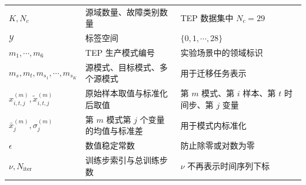 \documentclass{seuthesis-2022}
\begin{document}
{\begin{longtable}{@{}>{\raggedright\arraybackslash}p{}>{\raggedright\arraybackslash}p{}>{\raggedright\arraybackslash}p{}@{}}
    $K,N_c$ & 源域数量、故障类别数量 & TEP 数据集中 $N_c=29$ \\
    $\mathcal{Y}$ & 标签空间 & $\{0,1,\cdots,28\}$ \\
    $m_1,\cdots,m_6$ & TEP 生产模式编号 & 实验场景中的领域标识 \\
    $m_s,m_t,m_{s_1},\cdots,m_{s_K}$ & 源模式、目标模式、多个源模式 & 用于迁移任务表示 \\
    $x_{i,t,j}^{(m)},\tilde{x}_{i,t,j}^{(m)}$ & 原始样本取值与标准化后取值 & 第 $m$ 模式、第 $i$ 样本、第 $t$ 时间步、第 $j$ 变量 \\
    $\bar{x}_{j}^{(m)},\sigma_{j}^{(m)}$ & 第 $m$ 模式第 $j$ 个变量的均值与标准差 & 用于模式内标准化 \\
    $\epsilon$ & 数值稳定常数 & 防止除零或对数为零 \\
    $\nu,N_{\mathrm{iter}}$ & 训练步索引与总训练步数 & $\nu$ 不再表示时间序列下标 \\


\end{longtable}}
\end{document}
